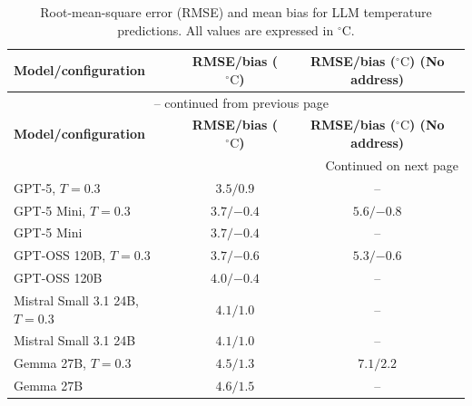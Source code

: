 \begin{longtable}{@{}lcc@{}}
    \caption{
        Root-mean-square error (RMSE) and mean bias for LLM temperature
        predictions. All values are expressed in \(^{\circ}\mathrm{C}\).
    }
    \label{tab:llm-temperature-performance}\\

    \toprule
    \textbf{Model/configuration}
    & \textbf{RMSE/bias (\(^{\circ}\mathrm{C}\))}
    & \textbf{RMSE/bias (\(^{\circ}\mathrm{C}\)) (No address)} \\
    \midrule
    \endfirsthead

    \multicolumn{3}{c}{%
        \tablename\ \thetable{} -- continued from previous page
    }\\
    \toprule
    \textbf{Model/configuration}
    & \textbf{RMSE/bias (\(^{\circ}\mathrm{C}\))}
    & \textbf{RMSE/bias (\(^{\circ}\mathrm{C}\)) (No address)} \\
    \midrule
    \endhead

    \midrule
    \multicolumn{3}{r}{Continued on next page}\\
    \endfoot

    \bottomrule
    \endlastfoot

    GPT-5, \(T=0.3\)
        & \(3.5 / 0.9\)
        & -- \\

    GPT-5 Mini, \(T=0.3\)
        & \(3.7 / {-0.4}\)
        & \(5.6 / {-0.8}\) \\

    GPT-5 Mini
        & \(3.7 / {-0.4}\)
        & -- \\

    GPT-OSS 120B, \(T=0.3\)
        & \(3.7 / {-0.6}\)
        & \(5.3 / {-0.6}\) \\

    GPT-OSS 120B
        & \(4.0 / {-0.4}\)
        & -- \\

    Mistral Small 3.1 24B, \(T=0.3\)
        & \(4.1 / 1.0\)
        & -- \\

    Mistral Small 3.1 24B
        & \(4.1 / 1.0\)
        & -- \\

    Gemma 27B, \(T=0.3\)
        & \(4.5 / 1.3\)
        & \(7.1 / 2.2\) \\

    Gemma 27B
        & \(4.6 / 1.5\)
        & -- \\


\end{longtable}

